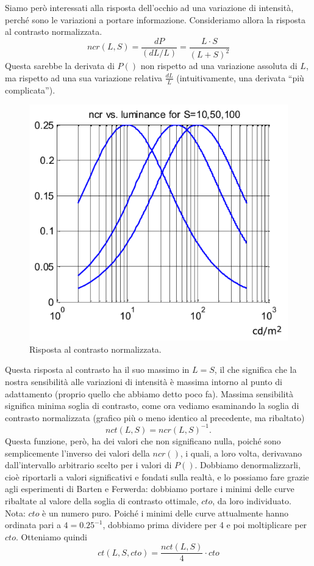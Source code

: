 \documentclass[a4paper,11pt]{article}
\begin{document}
\par
Siamo però interessati alla risposta dell'occhio ad una variazione di intensità, perché sono le variazioni a portare informazione. Consideriamo allora la risposta al contrasto normalizzata.
\[ncr(L,S) = \frac{dP}{(dL/L)} = \frac{L\cdot S}{(L+S)^2}\]
Questa sarebbe la derivata di $P()$ non rispetto ad una variazione assoluta di $L$, ma rispetto ad una sua variazione relativa $\frac{dL}{L}$ (intuitivamente, una derivata ``più complicata'').

\renewcommand{\thefigure}{2.8}
\begin{figure}[!h]
  \centering
    \includegraphics[scale=0.5]{images/2/ncr.png}
    \caption{Risposta al contrasto normalizzata.}
\end{figure}

Questa risposta al contrasto ha il suo massimo in $L=S$, il che significa che la nostra sensibilità alle variazioni di intensità
è massima intorno al punto di adattamento (proprio quello che abbiamo detto poco fa). Massima sensibilità significa minima soglia di contrasto, come ora
vediamo esaminando la soglia di contrasto normalizzata (grafico più o meno identico al precedente, ma ribaltato)
\[nct(L,S) = ncr(L,S)^{-1}.\]
Questa funzione, però, ha dei valori che non significano nulla, poiché sono semplicemente l'inverso dei valori della $ncr()$, i quali, a loro volta, derivavano dall'intervallo arbitrario
scelto per i valori di $P()$.
Dobbiamo denormalizzarli, cioè riportarli a valori significativi e fondati sulla realtà, e lo possiamo fare grazie agli esperimenti di Barten e Ferwerda: dobbiamo portare i minimi
delle curve ribaltate al valore della soglia di contrasto ottimale, $cto$, da loro individuato. Nota: $cto$ è un numero puro.
Poiché i minimi delle curve attualmente hanno ordinata pari a $4 = 0.25^{-1}$, dobbiamo prima dividere per 4 e poi moltiplicare per $cto$. Otteniamo quindi
\[ct(L,S,cto) = \frac{nct(L,S)}{4} \cdot cto\]
\end{document}
